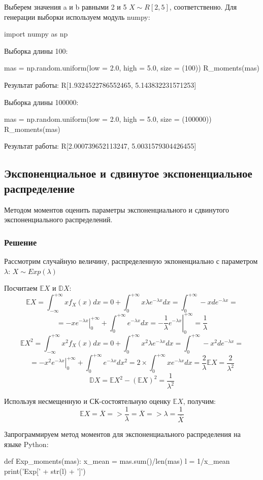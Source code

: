 \documentclass{article}
\begin{document}
Выберем значения a и b равными 2 и 5 $X \sim R[2, 5]$, соответственно.
Для генерации выборки используем модуль numpy:
\begin{python}
import numpy as np
\end{python}

Выборка длины 100:
\begin{python}
mas = np.random.uniform(low = 2.0, high = 5.0, size = (100))
R_moments(mas)
\end{python}
Результат работы:
R[1.9324522786552465, 5.143832231571253]

Выборка длины 100000:
\begin{python}
mas = np.random.uniform(low = 2.0, high = 5.0, size = (100000))
R_moments(mas)
\end{python}
Результат работы:
R[2.000739652113247, 5.0031579304426455]

\subsection{Экспоненциальное и сдвинутое экспоненциальное распределение}
Методом моментов оценить параметры экспоненциального и сдвинутого экспоненциального распределений. 
\subsubsection{Решение}
Рассмотрим случайную величину, распределенную экпоненциально с параметром $\lambda$: $X \sim Exp(\lambda)$

Посчитаем $\mathbb{E}X$ и $\mathbb{D}X$:
\[\mathbb{E}X = \int_{-\infty}^{+\infty}xf_X(x)dx = 0 + \int_{0}^{+\infty}x\lambda e^{-\lambda x}dx = \int_{0}^{+\infty}-xde^{-\lambda x} = \]
\[=\left.-xe^{-\lambda x}\right|_{0}^{+\infty} + \int_{0}^{+\infty}e^{-\lambda x}dx = \left.-\frac{1}{\lambda}e^{-\lambda x}\right|_{0}^{+\infty} = \frac{1}{\lambda}\]
\[\mathbb{E}X^2 = \int_{-\infty}^{+\infty}x^2f_X(x)dx = 0 + \int_{0}^{+\infty}x^2\lambda e^{-\lambda x}dx = \int_{0}^{+\infty}-x^2de^{-\lambda x} =\]
\[=\left.-x^2e^{-\lambda x}\right|_{0}^{+\infty} + \int_{0}^{+\infty}e^{-\lambda x}dx^2 = 2\times\int_{0}^{+\infty}xe^{-\lambda x}dx = \frac{2}{\lambda}\mathbb{E}X = \frac{2}{\lambda^2}\]
\[\mathbb{D}X = \mathbb{E}X^2 - (\mathbb{E}X)^2 = \frac{1}{\lambda^2}\]

Используя несмещенную и СК-состоятельную оценку $\mathbb{E}X$, получим:
\[\mathbb{E}X = \overline{X} => \frac{1}{\lambda}=\overline{X} => \lambda = \frac{1}{\overline{X}}\]

Запрограммируем метод моментов для экспоненциального распределения на языке Python:
\begin{python}
def Exp_moments(mas):
	x_mean = mas.sum()/len(mas)
	l = 1/x_mean
	print('Exp[' + str(l) + ']')
\end{python}
\end{document}
